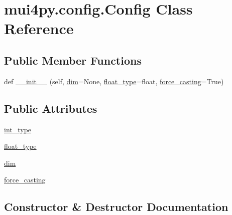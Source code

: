 \hypertarget{classmui4py_1_1config_1_1_config}{}\section{mui4py.\+config.\+Config Class Reference}
\label{classmui4py_1_1config_1_1_config}
\subsection*{Public Member Functions}
\begin{DoxyCompactItemize}
\item 
def \hyperlink{classmui4py_1_1config_1_1_config_a7c65e8b6791f438f0d90c7e36dbf7cea}{\+\_\+\+\_\+init\+\_\+\+\_\+} (self, \hyperlink{classmui4py_1_1config_1_1_config_addd7c29e335601f8ecf8de2cf2249529}{dim}=None, \hyperlink{classmui4py_1_1config_1_1_config_a9184bdfd670123f0bc5b5a01c129c2a7}{float\+\_\+type}=float, \hyperlink{classmui4py_1_1config_1_1_config_a312ab2c048989f940dce669885e32ca3}{force\+\_\+casting}=True)
\end{DoxyCompactItemize}
\subsection*{Public Attributes}
\begin{DoxyCompactItemize}
\item 
\hyperlink{classmui4py_1_1config_1_1_config_abf85377c513b830c2e1aa92274e70bcc}{int\+\_\+type}
\item 
\hyperlink{classmui4py_1_1config_1_1_config_a9184bdfd670123f0bc5b5a01c129c2a7}{float\+\_\+type}
\item 
\hyperlink{classmui4py_1_1config_1_1_config_addd7c29e335601f8ecf8de2cf2249529}{dim}
\item 
\hyperlink{classmui4py_1_1config_1_1_config_a312ab2c048989f940dce669885e32ca3}{force\+\_\+casting}
\end{DoxyCompactItemize}


\subsection{Constructor \& Destructor Documentation}
\mbox{\label{classmui4py_1_1config_1_1_config_a7c65e8b6791f438f0d90c7e36dbf7cea}} 
